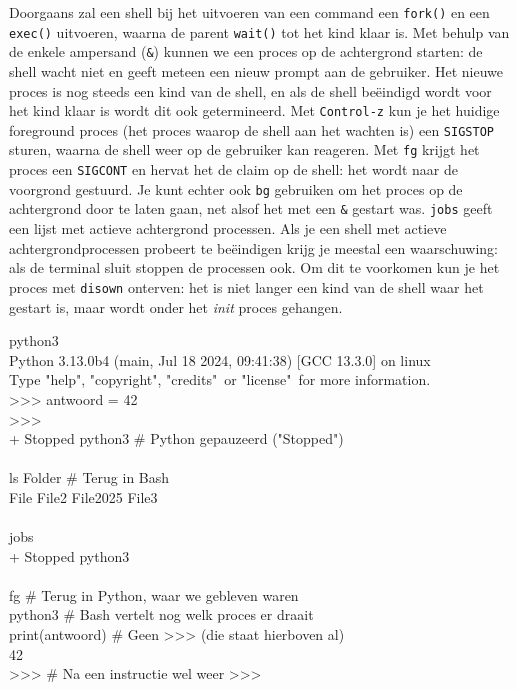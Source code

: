 Doorgaans zal een shell bij het uitvoeren van een command een \texttt{fork()} en een \texttt{exec()} uitvoeren, waarna de parent \texttt{wait()} tot het kind klaar is. Met behulp van de enkele ampersand (\texttt{\&}) kunnen we een proces op de achtergrond starten: de shell wacht niet en geeft meteen een nieuw prompt aan de gebruiker. Het nieuwe proces is nog steeds een kind van de shell, en als de shell beëindigd wordt voor het kind klaar is wordt dit ook getermineerd. Met \texttt{Control-z} kun je het huidige foreground proces (het proces waarop de shell aan het wachten is) een \texttt{SIGSTOP} sturen, waarna de shell weer op de gebruiker kan reageren. Met \texttt{fg} krijgt het proces een \texttt{SIGCONT} en hervat het de claim op de shell: het wordt naar de voorgrond gestuurd. Je kunt echter ook \texttt{bg} gebruiken om het proces op de achtergrond door te laten gaan, net alsof het met een \texttt{\&} gestart was. \texttt{jobs} geeft een lijst met actieve achtergrond processen. Als je een shell met actieve achtergrondprocessen probeert te beëindigen krijg je meestal een waarschuwing: als de terminal sluit stoppen de processen ook. Om dit te voorkomen kun je het proces met \texttt{disown} onterven: het is niet langer een kind van de shell waar het gestart is, maar wordt onder het \emph{init} proces gehangen.

\begin{bash}
\p[~] python3\\
Python 3.13.0b4 (main, Jul 18 2024, 09:41:38) [GCC 13.3.0] on linux \\
Type "help", "copyright", "credits"\  or "license"\ for more information.\\
>\!>\!> antwoord = 42\\
>\!>\!> \\
[1]+  Stopped                 python3                  \# Python gepauzeerd ("Stopped")\\
\\
\p[~] ls Folder                                \# Terug in Bash\\
File File2 File2025 File3\\
\\
\p[~] jobs\\
[1]+  Stopped                 python3\\
\\
\p[~] fg                                       \# Terug in Python, waar we gebleven waren\\
python3                                                \# Bash vertelt nog welk proces er draait\\
print(antwoord)                                        \# Geen >\!>\!> (die staat hierboven al)\\
42\\
>\!>\!>                                                    \# Na een instructie wel weer >\!>\!>\\
\end{bash}


